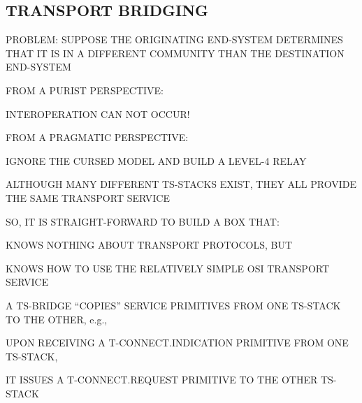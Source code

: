 \begin{bwslide}
\part*	{TRANSPORT BRIDGING}\bf

\begin{nrtc}
\item	PROBLEM: SUPPOSE THE ORIGINATING END-SYSTEM DETERMINES THAT
	IT IS IN A DIFFERENT COMMUNITY THAN THE DESTINATION END-SYSTEM

\item	FROM A PURIST PERSPECTIVE:
    \begin{nrtc}
    \item	INTEROPERATION CAN NOT OCCUR!
    \end{nrtc}

\item	FROM A PRAGMATIC PERSPECTIVE:
    \begin{nrtc}
    \item	IGNORE THE CURSED MODEL AND BUILD A LEVEL-4 RELAY
    \end{nrtc}
\end{nrtc}
\end{bwslide}


\begin{bwslide}

\begin{nrtc}
\item	ALTHOUGH MANY DIFFERENT TS-STACKS EXIST,
	THEY ALL PROVIDE THE SAME TRANSPORT SERVICE

\item	SO, IT IS STRAIGHT-FORWARD TO BUILD A BOX THAT:
    \begin{nrtc}
    \item	KNOWS NOTHING ABOUT TRANSPORT PROTOCOLS, BUT

    \item	KNOWS HOW TO USE THE RELATIVELY SIMPLE OSI TRANSPORT SERVICE
    \end{nrtc}

\item	A TS-BRIDGE ``COPIES'' SERVICE PRIMITIVES FROM ONE TS-STACK TO THE
	OTHER, e.g.,
    \begin{nrtc}
    \item	UPON RECEIVING A T-CONNECT.INDICATION PRIMITIVE FROM ONE
		TS-STACK,

    \item	IT ISSUES A T-CONNECT.REQUEST PRIMITIVE TO THE OTHER TS-STACK
    \end{nrtc}
\end{nrtc}
\end{bwslide}


